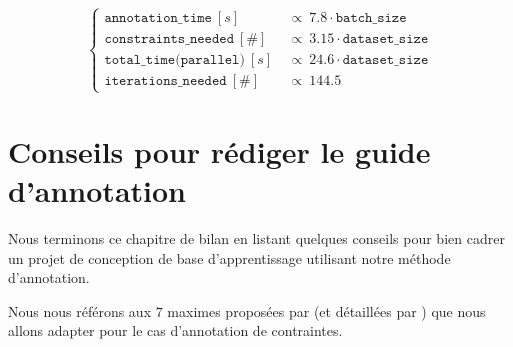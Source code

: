 		\begin{equation}
			\label{equation:5.5-GUIDE-COUTS}
			\begin{cases}
				\texttt{annotation\_time}~[s] &
					~\propto~7.8 \cdot \texttt{batch\_size} \\
				\texttt{constraints\_needed}~[\#] &
					~\propto~3.15 \cdot \texttt{dataset\_size} \\
				\texttt{total\_time(parallel)}~[s] &
					~\propto~24.6 \cdot \texttt{dataset\_size} \\
				\texttt{iterations\_needed}~[\#] &
					~\propto~144.5
			\end{cases}
		\end{equation}
	
	
	\newpage
	\section{Conseils pour rédiger le guide d'annotation}
		\label{section:5.6-GUIDE-REDIGER}
		
		Nous terminons ce chapitre de bilan en listant quelques conseils pour bien cadrer un projet de conception de base d'apprentissage utilisant notre méthode d'annotation.
		\begin{leftBarInformation}
			Nous nous référons aux $7$ maximes proposées par \cite{leech:1993:corpus-annotation-schemes} (et détaillées par \cite{fort:2022:manual-annotation-what}) que nous allons adapter pour le cas d'annotation de contraintes.
		\end{leftBarInformation}
		
